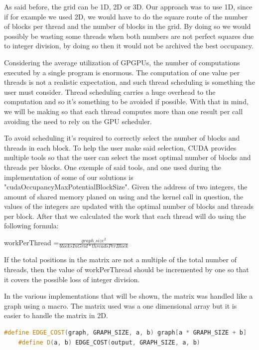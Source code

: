 \documentclass[conference]{IEEEtran}
\begin{document}
As said before, the grid can be 1D, 2D or 3D. Our approach was to use 1D, since if for example we used 2D, we would have to do the square route of the number of blocks per thread and the number of blocks in the grid. By doing so we would possibly be wasting some threads when both numbers are not perfect squares due to integer division, by doing so then it would not be archived the best occupancy\cite{occupancy}.

Considering the average utilization of GPGPUs, the number of computations executed by a single program is enormous. The computation of one value per threads is not a realistic expectation, and such thread scheduling is something the user must consider. Thread scheduling carries a huge overhead to the computation and so it's something to be avoided if possible. With that in mind, we will be making so that each thread computes more than one result per call avoiding the need to rely on the GPU scheduler. 

To avoid scheduling it's required to correctly select the number of blocks and threads in each block. To help the user make said selection, CUDA provides multiple tools so that the user can select the most optimal number of blocks and threads per blocks. One exemple of said tools, and one used during the implementation of some of our solutions is "cudaOccupancyMaxPotentialBlockSize". Given the address of two integers, the amount of shared memory planed on using and the kernel call in question, the values of the integers are updated with the optimal number of blocks and threads per block. After that we calculated the work that each thread will do using the following formula:
\newline\newline
\centerline{workPerThread =$\frac{graph\_size^2}{blocksInGrid*threadsPerBlock}$}
\newline\newline
If the total positions in the matrix are not a multiple of the total number of threads, then the value of workPerThread should be incremented by one so that it covers the possible loss of integer division.

In the various implementations that will be shown, the matrix was handled like a graph using a macro. The matrix used was a one dimensional array but it is easier to handle the matrix in 2D.

\begin{lstlisting}[language=C++, caption=Macros used]
	#define EDGE_COST(graph, GRAPH_SIZE, a, b) graph[a * GRAPH_SIZE + b]
	#define D(a, b) EDGE_COST(output, GRAPH_SIZE, a, b)
\end{lstlisting}
\end{document}
